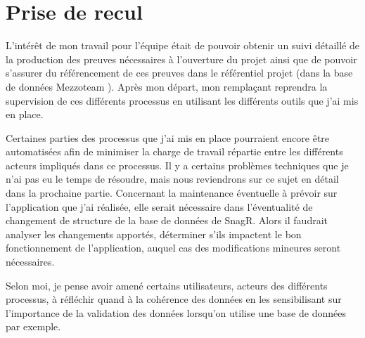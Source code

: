 \newpage

\section{Prise de recul}
L'intérêt de mon travail pour l'équipe était de pouvoir obtenir un suivi détaillé de la production des preuves nécessaires à l'ouverture du projet ainsi que de pouvoir s'assurer du référencement de ces preuves dans le référentiel projet (dans la base de données \gls{Mezzoteam} ). Après mon départ, mon remplaçant reprendra la supervision de ces différents processus en utilisant les différents outils que j'ai mis en place.

Certaines parties des processus que j'ai mis en place pourraient encore être automatisées afin de minimiser la charge de travail répartie entre les différents acteurs impliqués dans ce processus.
Il y a certains problèmes techniques que je n'ai pas eu le temps de résoudre, mais nous reviendrons sur ce sujet en détail dans la prochaine partie.
Concernant la maintenance éventuelle à prévoir sur l'application que j'ai réalisée, elle serait nécessaire dans l'éventualité de changement de structure de la base de données de \gls{SnagR}.
Alors il faudrait analyser les changements apportés, déterminer s’ils impactent le bon fonctionnement de l'application, auquel cas des modifications mineures seront nécessaires.


Selon moi, je pense avoir amené certains utilisateurs, acteurs des différents processus, à réfléchir quand à la cohérence des données en les sensibilisant sur l'importance de la validation des données lorsqu'on utilise une base de données par exemple.
